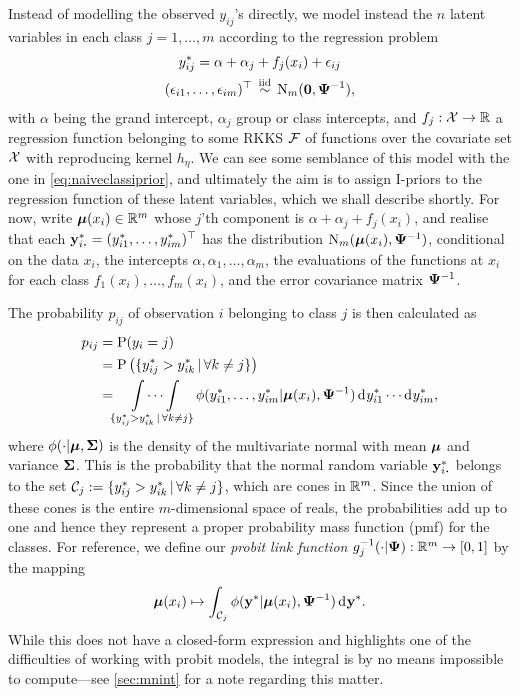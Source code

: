 Instead of modelling the observed $y_{ij}$'s directly, we model instead the $n$ latent variables in each class $j=1,\dots,m$ according to the regression problem
\begin{equation}\label{eq:multinomial-latent}
  \begin{gathered}
    y_{ij}^* = \alpha + \alpha_j + f_j(x_i) + \epsilon_{ij} \\
    (\epsilon_{i1}, \dots, \epsilon_{im})^\top  \,\overset{\text{iid}}{\sim}\, \operatorname{N}_m({\mathbf 0}, {\bm\Psi}^{-1}), 
  \end{gathered}
\end{equation}
with $\alpha$ being the grand intercept, $\alpha_j$ group or class intercepts, and $f_j:{\mathcal X} \to \mathbb{R}$ a regression function belonging to some RKKS ${\mathcal F}$ of functions over the covariate set ${\mathcal X}$ with reproducing kernel $h_\eta$.
We can see some semblance of this model with the one in \cref{eq:naiveclassiprior}, and ultimately the aim is to assign I-priors to the regression function of these latent variables, which we shall describe shortly.
For now, write ${\bm\mu}(x_i) \in \mathbb{R}^m$ whose $j$'th component is $\alpha + \alpha_j + f_j(x_i)$, and realise that each $\by_{i \bigcdot}^* = (y_{i1}^*, \dots, y_{im}^*)^\top$ has the distribution $\operatorname{N}_m({\bm\mu}(x_i), {\bm\Psi}^{-1})$, conditional on the data $x_i$,  the intercepts $\alpha,\alpha_1,\dots,\alpha_m$, the evaluations of the functions at $x_i$ for each class $f_1(x_i), \dots, f_m(x_i)$, and the error covariance matrix ${\bm\Psi}^{-1}$.

\newcommand{\intset}{\{y_{ij}^* > y_{ik}^* \,|\, \forall k \neq j\}}
The probability $p_{ij}$ of observation $i$ belonging to class $j$ is then calculated as 
\begin{align}
  p_{ij} 
  &= \Prob(y_i = j) \nonumber \\
  &= \Prob\big(\intset\big) \nonumber \\
  &= \idotsint\displaylimits_{\intset} \phi(y_{i1}^*, \dots, y_{im}^*|\bmu(x_i), \bPsi^{-1}) \dint y_{i1}^* \cdots \dint y_{im}^*,\label{eq:pij}
\end{align}
where $\phi(\cdot|{\bm\mu},{\bm\Sigma})$ is the density of the multivariate normal with mean ${\bm\mu}$ and variance ${\bm\Sigma}$.
This is the probability that the normal random variable $\by_{i \bigcdot}^*$ belongs to the set $\cC_j := \intset$, which are cones in $\mathbb{R}^m$.
Since the union of these cones is the entire $m$-dimensional space of reals, the probabilities add up to one and hence they represent a proper probability mass function (pmf) for the classes.
For reference, we define our \emph{probit link function} $  g_j^{-1}(\cdot|{\bm\Psi}): \mathbb{R}^{m} \to [0,1]$ by the mapping
\begin{equation}\label{eq:probitlink}
  {\bm\mu}(x_i) \mapsto \int_{{\mathcal C}_j} \phi({\mathbf y}^*|{\bm\mu}(x_i),{\bm\Psi}^{-1}) \operatorname{d}\hspace{0.5pt}\! {\mathbf y}^*.
\end{equation}
While this does not have a closed-form expression and highlights one of the difficulties of working with probit models, the integral is by no means impossible to compute---see \cref{sec:mnint} for a note regarding this matter.


